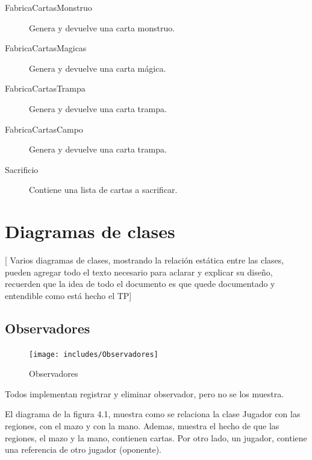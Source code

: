 \begin{description}
\item[FabricaCartasMonstruo] Genera y devuelve una carta monstruo.

\item[FabricaCartasMagicas] Genera y devuelve una carta mágica.

\item[FabricaCartasTrampa] Genera y devuelve una carta trampa.

\item[FabricaCartasCampo] Genera y devuelve una carta trampa.

\item[Sacrificio] Contiene una lista de cartas a sacrificar.

\end{description}


\clearpage
\section{Diagramas de clases}

[ Varios diagramas de clases, mostrando la relación estática entre las
clases, pueden agregar todo el texto necesario para aclarar y explicar su
diseño, recuerden que la idea de todo el documento es que quede
documentado y entendible como está hecho el TP]

\subsection{Observadores}

\begin{figure}[H]
	\centering
	\texttt{[image: includes/Observadores]}
	\caption{Observadores}
	\label{Observadores}
\end{figure}

Todos implementan registrar y eliminar observador, pero no se los muestra.



El diagrama de la figura 4.1, muestra como se relaciona la clase Jugador con las regiones, con el mazo y con la mano. Ademas, muestra el hecho de que las regiones, el mazo y la mano, contienen cartas. Por otro lado, un jugador, contiene una referencia de otro jugador (oponente).

